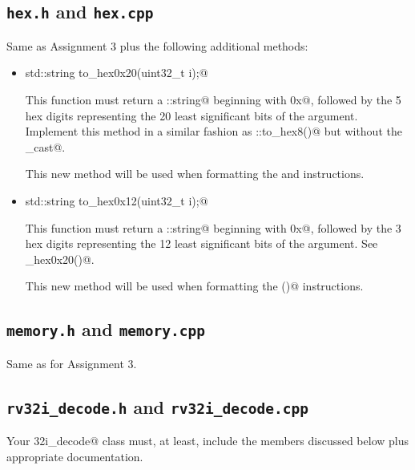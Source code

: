 \documentclass[11pt]{article}
\begin{document}
\subsection{{\tt hex.h} and {\tt hex.cpp}}

Same as Assignment 3 plus the following additional methods:

\begin{itemize}
\item \verb@static std::string to_hex0x20(uint32_t i);@

This function must return a \verb@std::string@ beginning with \verb@0x@, followed by
the 5 hex digits representing the 20 least significant bits of the \verb@i@ argument.  
Implement this method in 
a similar fashion as \verb@hex::to_hex8()@ but without the \verb@static_cast@.

This new method will be used when formatting the \verb@lui@ and \verb@auipc@ instructions.

\item \verb@static std::string to_hex0x12(uint32_t i);@

This function must return a \verb@std::string@ beginning with \verb@0x@, followed by
the 3 hex digits representing the 12 least significant bits of the \verb@i@ argument.
See \verb@to_hex0x20()@.

This new method will be used when formatting the \verb@csrrX()@ instructions.


\end{itemize}




\subsection{{\tt memory.h} and {\tt memory.cpp}}

Same as for Assignment 3. 





\subsection{{\tt rv32i\_decode.h} and {\tt rv32i\_decode.cpp}}

Your \verb@rv32i_decode@ class must, at least, include the members 
discussed below plus appropriate documentation.
\end{document}
